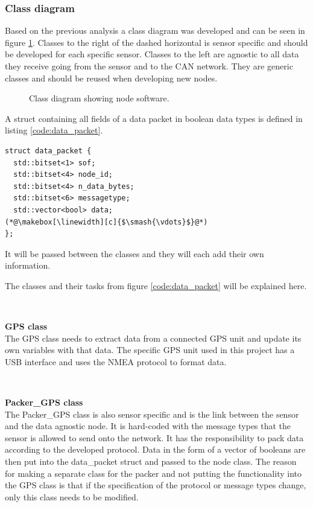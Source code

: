 \subsubsection*{Class diagram}
Based on the previous analysis a class diagram was developed and can be seen in figure \ref{fig:node_class_diagram}.
Classes to the right of the dashed horizontal is sensor specific and should be developed for each specific sensor.
Classes to the left are agnostic to all data they receive going from the sensor and to the CAN network.
They are generic classes and should be reused when developing new nodes.

\begin{figure}[!h]
\centering
{}
\caption{Class diagram showing node software.}
\label{fig:node_class_diagram}
\end{figure}

A struct containing all fields of a data packet in boolean data types is defined in listing \ref{code:data_packet}.  

\begin{lstlisting}[caption=Struct for data packet.,label=code:data_packet]
struct data_packet {
  std::bitset<1> sof;
  std::bitset<4> node_id;
  std::bitset<4> n_data_bytes;
  std::bitset<6> messagetype;
  std::vector<bool> data;
(*@\makebox[\linewidth][c]{$\smash{\vdots}$}@*)
};
\end{lstlisting}
It will be passed between the classes and they will each add their own information. 

The classes and their tasks from figure \ref{code:data_packet} will be explained here.


~\\ \par \textbf{GPS class} ~ \\
The GPS class needs to extract data from a connected GPS unit and update its own variables with that data.
The specific GPS unit used in this project has a USB interface and uses the NMEA protocol to format data.

~\\ \par \textbf{Packer\_GPS class} ~ \\
The Packer\_GPS class is also sensor specific and is the link between the sensor and the data agnostic node.
It is hard-coded with the message types that the sensor is allowed to send onto the network.
It has the responsibility to pack data according to the developed protocol.
Data in the form of a vector of booleans are then put into the data\_packet struct and passed to the node class.
The reason for making a separate class for the packer and not putting the functionality into the GPS class is that if the specification of the protocol or message types change, only this class needs to be modified.

